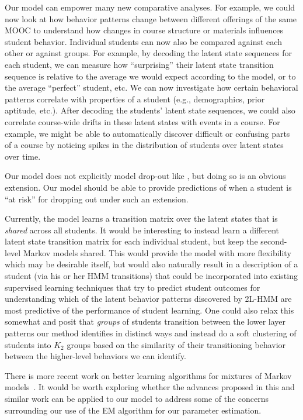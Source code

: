 Our model can empower many new comparative analyses. For example, we could
now look at how behavior patterns change between different offerings of
the same MOOC to understand how changes in course structure or materials
influences student behavior. Individual students can now also be compared
against each other or against groups. For example, by decoding the latent
state sequences for each student, we can measure how ``surprising'' their
latent state transition sequence is relative to the average we would expect
according to the model, or to the average ``perfect'' student, etc. We can
now investigate how certain behavioral patterns correlate with properties
of a student (e.g., demographics, prior aptitude, etc.). After decoding the
students' latent state sequences, we could also correlate course-wide
drifts in these latent states with events in a course. For example, we
might be able to automatically discover difficult or confusing parts of a
course by noticing spikes in the distribution of students over latent
states over time.

Our model does not explicitly model drop-out like
\citet{Kizilcec:2013:LAK}, but doing so is an obvious extension. Our model
should be able to provide predictions of when a student is ``at risk'' for
dropping out under such an extension.

Currently, the model learns a transition matrix over the latent states that
is \emph{shared} across all students. It would be interesting to instead
learn a different latent state transition matrix for each individual
student, but keep the second-level Markov models shared. This would provide
the model with more flexibility which may be desirable itself, but would
also naturally result in a description of a student (via his or her HMM
transitions) that could be incorporated into existing supervised learning
techniques that try to predict student outcomes for understanding
which of the latent behavior patterns discovered by 2L-HMM are most predictive
of the performance of student learning. One could also relax this somewhat
and posit that \emph{groups} of students transition between the lower layer
patterns our method identifies in distinct ways and instead do a soft
clustering of students into $K_2$ groups based on the similarity of their
transitioning behavior between the higher-level behaviors we can identify.

There is more recent work on better learning algorithms for mixtures of
Markov models~\citep{Gupta:2016:NIPS}. It would be worth exploring whether
the advances proposed in this and similar work can be applied to our model
to address some of the concerns surrounding our use of the EM algorithm for
our parameter estimation.
